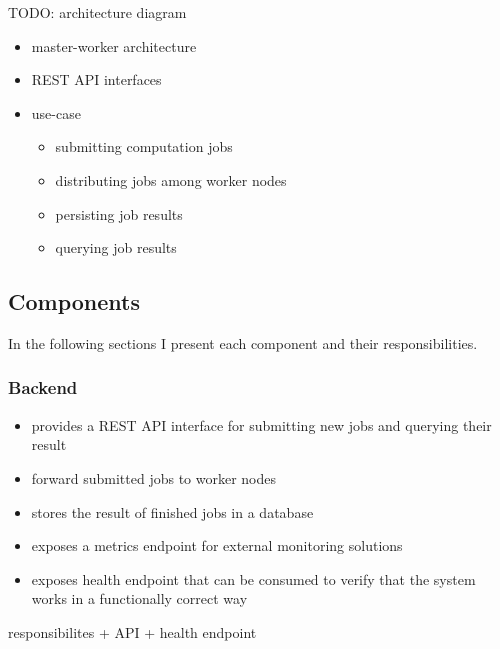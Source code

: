 TODO: architecture diagram

\begin{itemize}
	\item master-worker architecture
	\item REST API interfaces
	\item use-case
	\begin{itemize}
		\item submitting computation jobs
		\item distributing jobs among worker nodes
		\item persisting job results
		\item querying job results
	\end{itemize}
	
\end{itemize}


\subsection{Components}

In the following sections I present each component and their responsibilities.

\subsubsection{Backend}

\begin{itemize}
	\item provides a REST API interface for submitting new jobs and querying their result
	\item forward submitted jobs to worker nodes
	\item stores the result of finished jobs in a database
	\item exposes a metrics endpoint for external monitoring solutions
	\item exposes health endpoint that can be consumed to verify that the system works in a functionally correct way
\end{itemize}

responsibilites + API + health endpoint

